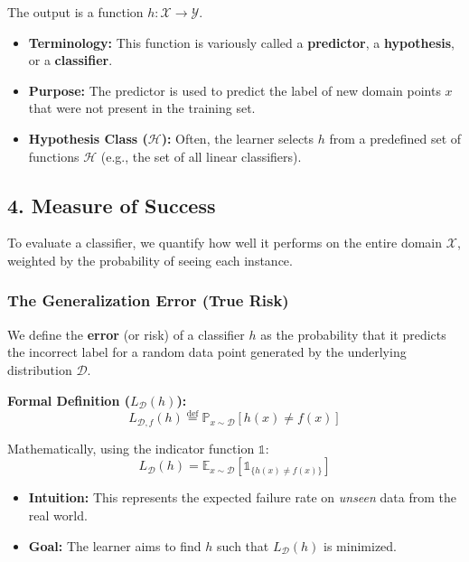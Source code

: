 \documentclass[
  italian,
  11pt,
]{article}
\providecommand{\tightlist}{%
  \setlength{\itemsep}{0pt}\setlength{\parskip}{0pt}}
\begin{document}
The output is a function \(h: \mathcal{X} \to \mathcal{Y}\).

\begin{itemize}
\tightlist
\item
  \textbf{Terminology:} This function is variously called a
  \textbf{predictor}, a \textbf{hypothesis}, or a \textbf{classifier}.
\item
  \textbf{Purpose:} The predictor is used to predict the label of new
  domain points \(x\) that were not present in the training set.
\item
  \textbf{Hypothesis Class (\(\mathcal{H}\)):} Often, the learner
  selects \(h\) from a predefined set of functions \(\mathcal{H}\)
  (e.g., the set of all linear classifiers).
\end{itemize}

\subsection{4. Measure of Success}\label{measure-of-success}

To evaluate a classifier, we quantify how well it performs on the entire
domain \(\mathcal{X}\), weighted by the probability of seeing each
instance.

\subsubsection{The Generalization Error (True
Risk)}\label{the-generalization-error-true-risk}

We define the \textbf{error} (or risk) of a classifier \(h\) as the
probability that it predicts the incorrect label for a random data point
generated by the underlying distribution \(\mathcal{D}\).

\textbf{Formal Definition (\(L_{\mathcal{D}}(h)\)):}
\[ L_{\mathcal{D}, f}(h) \overset{\text{def}}{=} \mathbb{P}_{x \sim \mathcal{D}} [h(x) \neq f(x)] \]

Mathematically, using the indicator function \(\mathbb{1}\):
\[ L_{\mathcal{D}}(h) = \mathbb{E}_{x \sim \mathcal{D}} [\mathbb{1}_{\{h(x) \neq f(x)\}}] \]

\begin{itemize}
\tightlist
\item
  \textbf{Intuition:} This represents the expected failure rate on
  \emph{unseen} data from the real world.
\item
  \textbf{Goal:} The learner aims to find \(h\) such that
  \(L_{\mathcal{D}}(h)\) is minimized.
\end{itemize}
\end{document}
